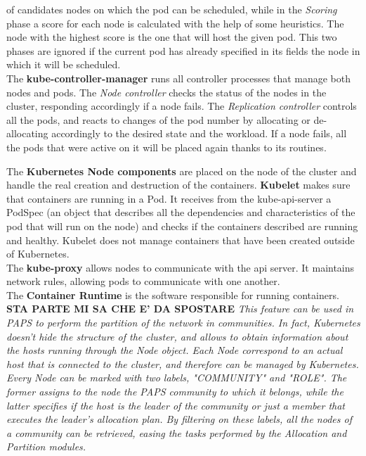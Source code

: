 of candidates nodes on which the pod can be scheduled, while in the \textit{Scoring} phase
a score for each node is calculated with the help of some heuristics. The node with the highest score
is the one that will host the given pod.
This two phases are ignored if the current pod has already specified in its fields the node
in which it will be scheduled.
\\
The \textbf{kube-controller-manager} runs all controller processes that manage both nodes and 
pods. The \textit{Node controller}
checks the status of the nodes in the cluster, responding accordingly if a node fails.
The \textit{Replication controller} controls all the pods, and reacts to changes of the pod number
by allocating or de-allocating accordingly to the desired state and the workload. If a node fails, all 
the pods that were active on it will be placed again thanks to its routines.
\par 
The \textbf{Kubernetes Node components} are placed on the node of the cluster and handle
the real creation and destruction of the containers.
\textbf{Kubelet} makes sure that containers are running in a Pod. It receives from the kube-api-server
a PodSpec (an object that describes all the dependencies and characteristics of the pod that
will run on the node) and checks if the containers described are running and healthy.
Kubelet does not manage containers that have been created outside of Kubernetes.
\\
The \textbf{kube-proxy} allows nodes to communicate with the api server. It maintains network rules,
allowing pods to communicate with one another.
\\
The \textbf{Container Runtime} is the software responsible for running containers.
\newline
\newline
\textbf{STA PARTE MI SA CHE E' DA SPOSTARE}
\textit{This feature can be used in PAPS to perform the partition of the network in communities.
In fact, Kubernetes doesn't hide the structure of the cluster, and allows to obtain information about
the hosts running through the Node object. Each Node correspond to an actual host that is
connected to the cluster, and therefore can be managed by Kubernetes. 
Every Node can be marked with two labels, "COMMUNITY" and "ROLE". The former assigns to the node 
the PAPS community to which it belongs, while the latter specifies if the host is the leader of the
community or just a member that executes the leader's allocation plan.
By filtering on these labels, all the nodes of a community can be retrieved, easing the tasks performed 
by the Allocation and Partition modules.}